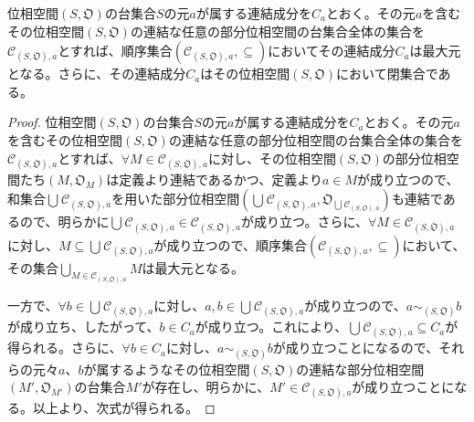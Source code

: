 \documentclass[dvipdfmx]{jsarticle}
\begin{document}
\begin{thm}\label{8.1.5.9}
位相空間$\left( S,\mathfrak{O} \right)$の台集合$S$の元$a$が属する連結成分を$C_{a}$とおく。その元$a$を含むその位相空間$\left( S,\mathfrak{O} \right)$の連結な任意の部分位相空間の台集合全体の集合を$\mathcal{C}_{\left( S,\mathfrak{O} \right),a}$とすれば、順序集合$\left( \mathcal{C}_{\left( S,\mathfrak{O} \right),a}, \subseteq \right)$においてその連結成分$C_{a}$は最大元となる。さらに、その連結成分$C_{a}$はその位相空間$\left( S,\mathfrak{O} \right)$において閉集合である。
\end{thm}
\begin{proof}
位相空間$\left( S,\mathfrak{O} \right)$の台集合$S$の元$a$が属する連結成分を$C_{a}$とおく。その元$a$を含むその位相空間$\left( S,\mathfrak{O} \right)$の連結な任意の部分位相空間の台集合全体の集合を$\mathcal{C}_{\left( S,\mathfrak{O} \right),a}$とすれば、$\forall M \in \mathcal{C}_{\left( S,\mathfrak{O} \right),a}$に対し、その位相空間$\left( S,\mathfrak{O} \right)$の部分位相空間たち$\left( M,\mathfrak{O}_{M} \right)$は定義より連結であるかつ、定義より$a \in M$が成り立つので、和集合$\bigcup_{} \mathcal{C}_{\left( S,\mathfrak{O} \right),a}$を用いた部分位相空間$\left( \bigcup_{} \mathcal{C}_{\left( S,\mathfrak{O} \right),a},\mathfrak{O}_{\bigcup_{} \mathcal{C}_{\left( S,\mathfrak{O} \right),a}} \right)$も連結であるので、明らかに$\bigcup_{} \mathcal{C}_{\left( S,\mathfrak{O} \right),a} \in \mathcal{C}_{\left( S,\mathfrak{O} \right),a}$が成り立つ。さらに、$\forall M \in \mathcal{C}_{\left( S,\mathfrak{O} \right),a}$に対し、$M \subseteq \bigcup_{} \mathcal{C}_{\left( S,\mathfrak{O} \right),a}$が成り立つので、順序集合$\left( \mathcal{C}_{\left( S,\mathfrak{O} \right),a}, \subseteq \right)$において、その集合$\bigcup_{M \in \mathcal{C}_{\left( S,\mathfrak{O} \right),a}} M$は最大元となる。\par
一方で、$\forall b \in \bigcup_{} \mathcal{C}_{\left( S,\mathfrak{O} \right),a}$に対し、$a,b \in \bigcup_{} \mathcal{C}_{\left( S,\mathfrak{O} \right),a}$が成り立つので、$a \sim_{\left( S,\mathfrak{O} \right)}b$が成り立ち、したがって、$b \in C_{a}$が成り立つ。これにより、$\bigcup_{} \mathcal{C}_{\left( S,\mathfrak{O} \right),a} \subseteq C_{a}$が得られる。さらに、$\forall b \in C_{a}$に対し、$a \sim_{\left( S,\mathfrak{O} \right)}b$が成り立つことになるので、それらの元々$a$、$b$が属するようなその位相空間$\left( S,\mathfrak{O} \right)$の連結な部分位相空間$\left( M',\mathfrak{O}_{M'} \right)$の台集合$M'$が存在し、明らかに、$M' \in \mathcal{C}_{\left( S,\mathfrak{O} \right),a}$が成り立つことになる。以上より、次式が得られる。

\end{proof}
\end{document}
